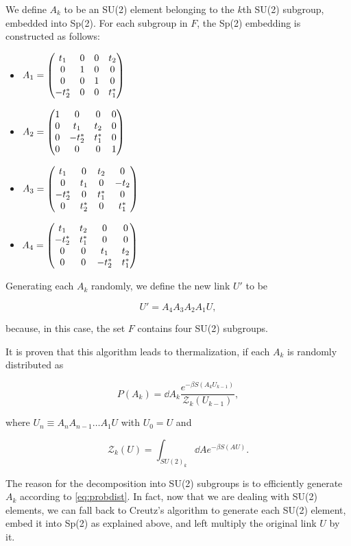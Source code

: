 \documentclass[reqno,12pt]{article}
\numberwithin{equation}{section}
\begin{document}
We define $A_k$ to be an SU(2) element belonging to the $k$th SU(2) subgroup, embedded into Sp(2). For each subgroup in $F$,
the Sp(2) embedding is constructed as follows:
\begin{itemize}
	\item $A_1 = \mqty(
		t_1 & 0 & 0 & t_2 \\
		0 & 1 & 0 & 0 \\
		0 & 0 & 1 & 0 \\
		-t^*_2 & 0 & 0 & t^*_1 
		)$
	\item $A_2 = \mqty(
		1 & 0 & 0 & 0 \\
		0 & t_1 & t_2 & 0 \\
		0 & -t^*_2 & t^*_1 & 0 \\
		0 & 0 & 0 & 1 
		)$
	\item $A_3 = \mqty(
		t_1 & 0 & t_2 & 0 \\
		0 & t_1 & 0 & -t_2 \\
		-t_2^* & 0 & t^*_1 & 0 \\
		0 & t^*_2 & 0 & t^*_1 
		)$
	\item $A_4 = \mqty(
		t_1 & t_2 & 0 & 0 \\
		-t^*_2 & t^*_1 & 0 & 0 \\
		0 & 0 & t_1 & t_2  \\
		0 & 0 & -t^*_2 & t^*_1 
		)$
\end{itemize}

Generating each $A_k$ randomly, we define the new link $U'$ to be

\begin{equation}
	U' = A_4 A_3 A_2 A_1 U,
\end{equation}

because, in this case, the set $F$ contains four SU(2) subgroups.

It is proven \cite{cabibbo} that this algorithm leads to thermalization, if each $A_k$ is randomly distributed as

\begin{equation} \label{eq:probdist}
	P(A_k) = \dd{A_k} \frac{e^{-\beta S(A_k U_{k-1})}}{\mathcal{Z}_k(U_{k-1})},
\end{equation}

where $U_{n} \equiv A_n A_{n-1} \dots A_1 U$ with $U_0 = U$ and 

\begin{equation}
	\mathcal{Z}_k(U) = \int_{SU(2)_k} \dd{A} e^{-\beta S(AU)}.
\end{equation}


The reason for the decomposition into SU(2) subgroups is to efficiently generate $A_k$ according to 
\eqref{eq:probdist}. In fact, now that we are dealing with SU(2) elements, we can fall back to Creutz's
algorithm \cite{creutz} to generate each SU(2) element, embed it into Sp(2) as explained above, and left multiply
the original link $U$ by it. 
\end{document}
